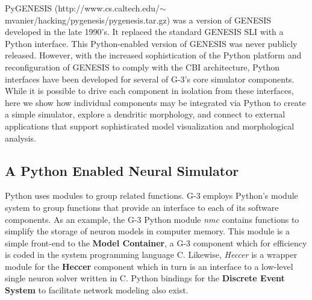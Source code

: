 \documentclass[10pt]{article}
\begin{document}
PyGENESIS
(http://www.cs.caltech.edu/$\sim$mvanier/hacking/pygenesis/pygenesis.tar.gz)
was a version of GENESIS developed in the late 1990's. It replaced the
standard GENESIS SLI with a Python interface. This Python-enabled
version of GENESIS was never publicly released.  However, with the
increased sophistication of the Python platform and reconfiguration of
GENESIS to comply with the CBI architecture, Python interfaces have
been developed for several of G-3's core simulator components.  While
it is possible to drive each component in isolation from these
interfaces, here we show how individual components may be integrated
via Python to create a simple simulator, explore a
dendritic morphology, and connect to external applications that
support sophisticated model visualization and morphological analysis.

\subsection*{A Python Enabled Neural Simulator}
\label{ss-apens}

Python uses modules to group related functions.  G-3 employs Python's
module system to group functions that provide an interface to each of
its software components.
As an example, the G-3 Python module {\it nmc} contains functions to
simplify the storage of neuron models in computer memory.  This module
is a simple front-end to the {\bf Model Container}, a G-3 component
which for efficiency is coded in the system programming language C.
Likewise, {\it Heccer} is a wrapper module for the {\bf Heccer}
component which in turn is an interface to a low-level single neuron
solver written in C.  Python bindings for the {\bf Discrete Event System} to facilitate network modeling also exist.
\end{document}
